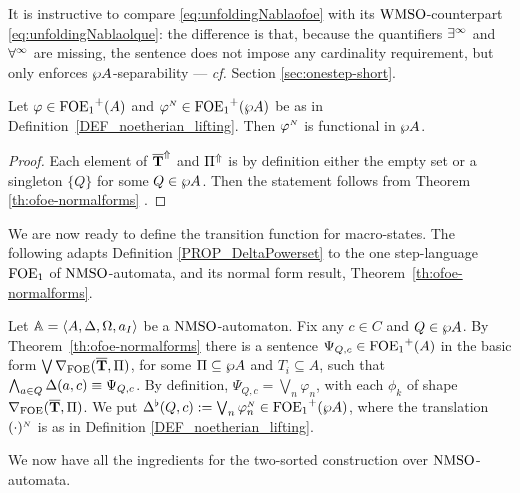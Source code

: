 It is instructive to compare \eqref{eq:unfoldingNablaofoe} with its
$\mathrm{WMSO}$-counterpart \eqref{eq:unfoldingNablaolque}: the difference is that,
because the quantifiers $\exists^\infty$ and $\forall^\infty$ are missing, the sentence does not
impose any cardinality requirement, but only enforces $\wp A$-separability --- \emph{cf.} Section \ref{sec:onestep-short}.

\begin{lemma}\label{lemma:automatafunctionalsentence}
Let $\varphi \in {\ensuremath{\mathrm{FOE}_1}}^+(A)$ and $\varphi^{{\scriptscriptstyle N}}\in {\ensuremath{\mathrm{FOE}_1}}^+(\wp A )$ be as in Definition~\ref{DEF_noetherian_lifting}. Then $\varphi^{{\scriptscriptstyle N}}$ is functional in $\wp A$.
 \end{lemma}
\begin{proof}
Each element of $\overline{{\mathbf{T}}}^{\Uparrow}$ and $\Pi^{\Uparrow}$ is by definition either the empty set or a singleton $\{Q\}$ for some $Q \in \wp A$. Then the statement follows from Theorem \ref{th:ofoe-normalforms} .\end{proof}

 We are now ready to define the transition function for macro-states. The following adapts Definition \ref{PROP_DeltaPowerset} to the one step-language $\mathrm{FOE}_1$ of $\mathrm{NMSO}$-automata, and its normal form result, Theorem~\ref{th:ofoe-normalforms}. 
\begin{definition}\label{PROP_DeltaPowerset_noet}
Let $\mathbb{A} = \langle{A,\Delta,\Omega,a_I}\rangle$ be a $\mathrm{NMSO}$-automaton. Fix any $c \in C$ and $Q \in \wp A$. By Theorem~\ref{th:ofoe-normalforms} there is a sentence $\Psi_{Q,c} \in {\ensuremath{\mathrm{FOE}_1}}^+(A)$ in the basic form $\bigvee \nabla_{\mathrm{FOE}}(\overline{{\mathbf{T}}},\Pi)$, for some $\Pi \subseteq \wp A$ and $T_i \subseteq A$, such that $\bigwedge_{a \in Q} \Delta(a,c) \equiv \Psi_{Q,c}$.
By definition, $\Psi_{Q,c} = \bigvee_{n}\varphi_n$, with each $\phi_{k}$ of shape $\nabla_{\mathrm{FOE}}(\overline{{\mathbf{T}}},\Pi)$.
%
We put $\Delta^{\flat}(Q,c) := \bigvee_{n}\varphi_n^{{\scriptscriptstyle N}}  \in {\ensuremath{\mathrm{FOE}_1}}^+(\wp A)$, where the translation $(\cdot)^{{\scriptscriptstyle N}}$ is as in Definition \ref{DEF_noetherian_lifting}.
\end{definition}

\noindent
We now have all the ingredients for the two-sorted construction over
$\mathrm{NMSO}$-automata.

